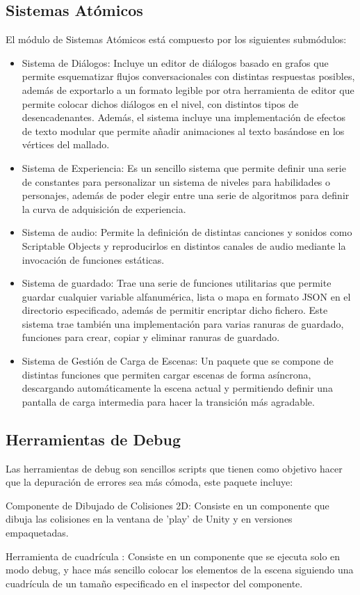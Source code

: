 \subsection{Sistemas Atómicos}
El módulo de Sistemas Atómicos está compuesto por los siguientes submódulos:
\begin{itemize}
  \item Sistema de Diálogos: Incluye un editor de diálogos basado en grafos que permite esquematizar flujos conversacionales con distintas respuestas posibles, 
  además de exportarlo a un formato legible por otra herramienta de editor que permite colocar dichos diálogos en el nivel, con distintos tipos de desencadenantes. Además, 
  el sistema incluye una implementación de efectos de texto modular que permite añadir animaciones al texto basándose en los vértices del mallado. 
  \item Sistema de Experiencia: Es un sencillo sistema que permite definir una serie de constantes para personalizar un sistema de niveles para habilidades o personajes,
   además de poder elegir entre una serie de algoritmos para definir la curva de adquisición de experiencia. 
  \item Sistema de audio: Permite la definición de distintas canciones y sonidos como Scriptable Objects y reproducirlos en distintos canales de audio 
   mediante la invocación de funciones estáticas.
  \item Sistema de guardado: Trae una serie de funciones utilitarias que permite guardar cualquier variable alfanumérica, lista o mapa en formato JSON en el directorio 
   especificado, además de permitir encriptar dicho fichero. Este sistema trae también una implementación para varias ranuras de guardado, funciones para crear, copiar y
   eliminar ranuras de guardado.
  \item Sistema de Gestión de Carga de Escenas: Un paquete que se compone de distintas funciones que permiten cargar escenas de forma asíncrona, descargando automáticamente 
   la escena actual y permitiendo definir una pantalla de carga intermedia para hacer la transición más agradable.
\end{itemize}

\subsection{Herramientas de Debug}
Las herramientas de debug son sencillos scripts que tienen como objetivo hacer que la depuración de errores sea más cómoda, este paquete incluye:
\begin{compactitem}
  \item Componente de Dibujado de Colisiones 2D: Consiste en un componente que dibuja las colisiones en la ventana de 'play' de Unity y en versiones empaquetadas.   
  \item Herramienta de cuadrícula : Consiste en un componente que se ejecuta solo en modo debug, y hace más sencillo colocar los elementos de la escena siguiendo una
   cuadrícula de un tamaño especificado en el inspector del componente. 
\end{compactitem} 


